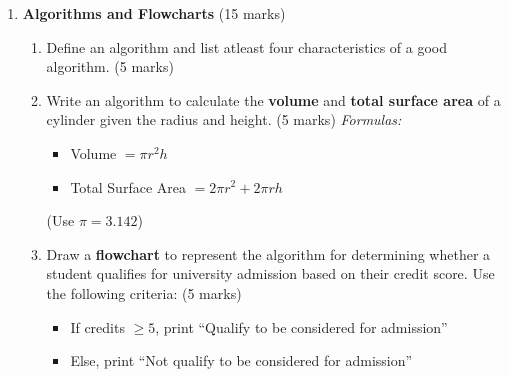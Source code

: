 \documentclass[12pt]{article}
\begin{document}
\begin{enumerate}[left=0pt, label=\bfseries Q\arabic*.]
    \item \textbf{Algorithms and Flowcharts} \hfill (15 marks)
    \begin{enumerate}[label=(\alph*)]
        \item Define an algorithm and list atleast four characteristics of a good algorithm. \hfill (5 marks)
        \item Write an algorithm to calculate the \textbf{volume} and \textbf{total surface area} of a cylinder given the radius and height. \hfill (5 marks)
        \emph{Formulas:}
        \begin{itemize}
            \item Volume $= \pi r^2 h$
            \item Total Surface Area $= 2\pi r^2 + 2\pi r h$
        \end{itemize}
        (Use $\pi = 3.142$)
        \item Draw a \textbf{flowchart} to represent the algorithm for determining whether a student qualifies for university admission based on their credit score. Use the following criteria: \hfill (5 marks)
        \begin{itemize}
            \item If credits $\ge 5$, print ``Qualify to be considered for admission''
            \item Else, print ``Not qualify to be considered for admission''
        \end{itemize}
    \end{enumerate}


\end{enumerate}
\end{document}
